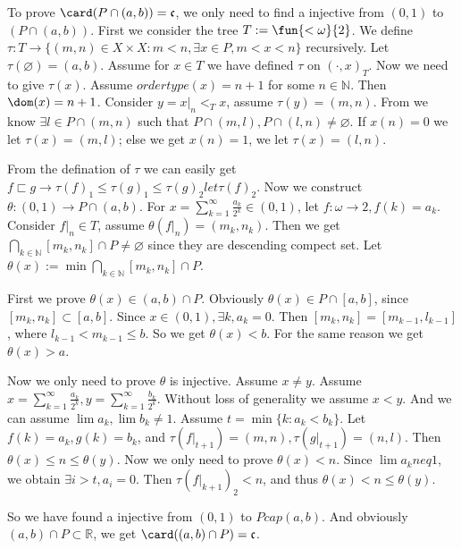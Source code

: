 \documentclass{ctexart}
\begin{document}
\begin{solution}
  To prove \(\card(P \cap(a,b))=\mathfrak{c}\), we only need to find a injective from \((0,1)\) to \((P \cap (a,b)) \). 
  First we consider the tree \(T:=\fun{<\omega}{2}\). We define \(\tau:T \to \{(m,n) \in X \times X:m<n,\exists x \in P,m<x<n\}\) recursively. 
  Let \(\tau(\varnothing)=(a,b)\). Assume for \(x \in T\) we have defined \(\tau\) on \((\cdot,x)_T\). Now we need to give \(\tau(x)\). 
  Assume \(ordertype(x)=n+1\) for some \(n \in \mathbb{N}\). Then \(\dom(x)=n+1\). 
  Consider \(y=x|_{n} <_T x\), assume \(\tau(y)=(m,n)\). 
  From  we know \(\exists l \in P \cap (m,n)\) such that \(P \cap (m,l),P \cap (l,n) \neq \varnothing\). 
  If \(x(n)=0\) we let \(\tau(x)=(m,l)\); else we get \(x(n)=1\), we let \(\tau(x)=(l,n)\). 

  From the defination of \(\tau\) we can easily get \(f \sqsubset g \to \tau(f)_1 \leq \tau(g)_1 \leq \tau(g)_2 let \tau(f)_2\). 
  Now we construct \(\theta:(0,1) \to P \cap (a,b)\). For \(x=\sum_{k=1}^{\infty} \frac{a_k}{2^k} \in (0,1)\), let \(f:\omega \to 2,f(k)=a_k\). 
  Consider \(f|_{n} \in T\), assume \(\theta(f|_{n})=(m_k,n_k)\). 
  Then we get \(\bigcap_{k \in \mathbb{N}} [m_k,n_k]\cap P \neq \varnothing\) since they are descending compect set. 
  Let \(\theta(x):= \min \bigcap_{k \in \mathbb{N}} [m_k,n_k]\cap P\). 

  First we prove \(\theta(x) \in (a,b) \cap P\). Obviously \(\theta(x) \in P \cap [a,b]\), since \([m_k,n_k] \subset [a,b]\). 
  Since \(x \in (0,1),\exists k,a_k =0\). Then \([m_k,n_k]= [m_{k-1},l_{k-1}]\), where \(l_{k-1}<m_{k-1} \leq b\). 
  So we get \(\theta(x)<b\). For the same reason we get \(\theta(x)>a\). 

  Now we only need to prove \(\theta\) is injective. Assume \(x \neq y\). 
  Assume \(x=\sum_{k=1}^{\infty} \frac{a_k}{2^k},y=\sum_{k=1}^{\infty} \frac{b_k}{2^k}\). Without loss of generality we assume \(x<y\). 
  And we can assume \(\lim a_k,\lim b_k \neq 1\). Assume \(t=\min\{k:a_k<b_k\}\). 
  Let \(f(k)=a_k,g(k)=b_k\), and \(\tau(f|_{t+1})=(m,n),\tau(g|_{t+1})=(n,l)\). 
  Then \(\theta(x) \leq n \leq \theta(y)\). Now we only need to prove \(\theta(x)<n\). 
  Since \(\lim a_k neq 1\), we obtain \(\exists i>t,a_i=0\). Then \(\tau(f|_{k+1})_2<n\), and thus \(\theta(x)<n \leq \theta(y)\). 

  So we have found a injective from \((0,1)\) to \(P cap (a,b)\). And obviously \((a,b) \cap P \subset \mathbb{R}\), we get \(\card((a,b) \cap P)=\mathfrak{c}\). 
\end{solution}
\end{document}

